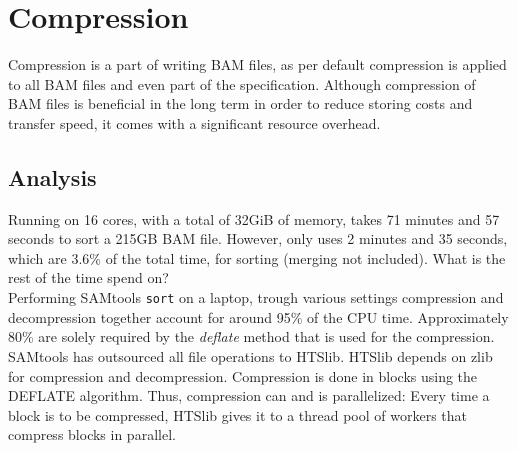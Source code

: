 \section{Compression} 
Compression is a part of writing BAM files, as per default compression is applied to all BAM files and even part of the specification. Although compression of BAM files is beneficial in the long term in order to reduce storing costs and transfer speed, it comes with a significant resource overhead. 

\subsection{Analysis}
Running on 16 cores, with a total of 32GiB of memory, \sort takes 71 minutes and 57 seconds to sort a 215GB BAM file. However, \sort only uses 2 minutes and 35 seconds, which are 3.6\% of the total time, for sorting (merging not included). What is the rest of the time spend on? \\ 
Performing SAMtools \texttt{sort} on a laptop, trough various settings compression and decompression together account for around 95\% of the CPU time. Approximately 80\% are solely required by the \textit{deflate} method that is used for the compression. \\
SAMtools has outsourced all file operations to HTSlib. HTSlib depends on zlib for compression and decompression. Compression is done in blocks using the DEFLATE algorithm. Thus, compression can and is parallelized: Every time a block is to be compressed, HTSlib gives it to a thread pool of workers that compress blocks in parallel.


